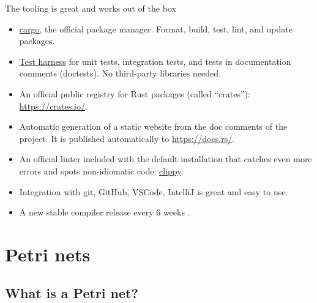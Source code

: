 \documentclass{beamer}
\begin{document}
\begin{frame}{The tooling is great and works out of the box}
  \begin{itemize}
    \item \href{https://doc.rust-lang.org/stable/cargo/}{cargo},
          the official package manager: Format, build, test, lint, and update packages.
    \pause
    \item \href{https://doc.rust-lang.org/book/ch11-00-testing.html}{Test harness}
          for unit tests, integration tests, and tests in documentation comments (doctests).
          No third-party libraries needed.
    \pause
    \item An official public registry for Rust packages (called ``crates''): \url{https://crates.io/}.
    \pause
    \item Automatic generation of a static website from the doc comments of the project.
          It is published automatically to \url{https://docs.rs/}.
    \pause
    \item An official linter included with the default installation that catches even more errors
          and spots non-idiomatic code: \href{https://github.com/rust-lang/rust-clippy}{clippy}.
    \pause
    \item Integration with git, GitHub, VSCode, IntelliJ is great and easy to use.
    \pause
    \item A new stable compiler release every 6 weeks \cite{albini2019}.
  \end{itemize}
\end{frame}

\section{Petri nets}

\subsection{What is a Petri net?}
\end{document}
